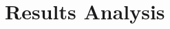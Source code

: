 \documentclass[results.tex]{subfiles}
\begin{document}
\section{Results Analysis} %
\label{sec:results}

\end{document}

